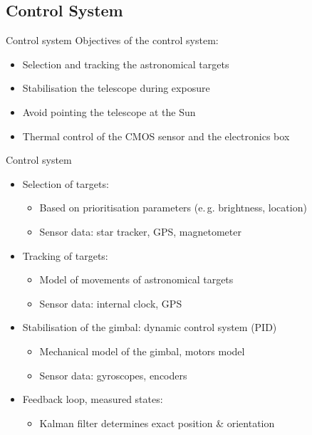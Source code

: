 \documentclass[11pt, aspectratio=169]{beamer}
\begin{document}
\subsection{Control System}

\begin{frame}{Control system}
    Objectives of the control system:
    \begin{itemize}
        \item Selection and tracking the astronomical targets
        \item Stabilisation the telescope during exposure
        \item Avoid pointing the telescope at the Sun
        \item Thermal control of the CMOS sensor and the electronics box
    \end{itemize}
\end{frame}

\begin{frame}{Control system}
    \begin{itemize}
        \item<1-> Selection of targets: %
        \begin{itemize}
            \item Based on prioritisation parameters (e.\,g. brightness, location)
            \item Sensor data: star tracker, GPS, magnetometer %
        \end{itemize}
        \item<2-> Tracking of targets: 
        \begin{itemize}
            \item Model of movements of astronomical targets
            \item Sensor data: internal clock, GPS
        \end{itemize}
        \item<3-> Stabilisation of the gimbal: dynamic control system (PID) %
        \begin{itemize}
            \item Mechanical model of the gimbal, motors model
            \item Sensor data: gyroscopes, encoders%
        \end{itemize}
        \item<4-> Feedback loop, measured states: 
        \begin{itemize}
            \item Kalman filter determines exact position \& orientation
        \end{itemize}
    \end{itemize}
\end{frame}
\end{document}
